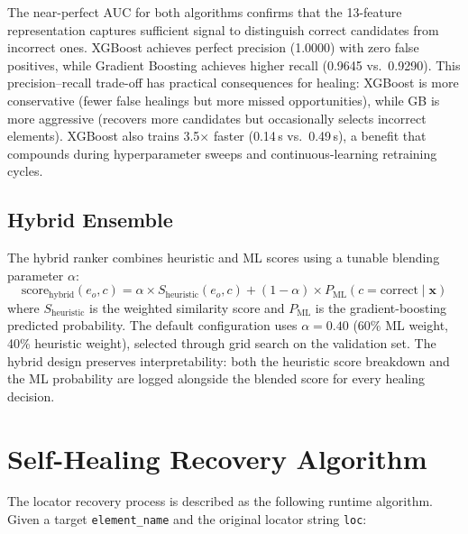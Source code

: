 \documentclass[12pt]{article}
\begin{document}
The near-perfect AUC for both algorithms confirms that the 13-feature representation captures sufficient signal to distinguish correct candidates from incorrect ones. XGBoost achieves perfect precision (1.0000) with zero false positives, while Gradient Boosting achieves higher recall (0.9645 vs.\ 0.9290). This precision--recall trade-off has practical consequences for healing: XGBoost is more conservative (fewer false healings but more missed opportunities), while GB is more aggressive (recovers more candidates but occasionally selects incorrect elements). XGBoost also trains 3.5$\times$ faster (0.14\,s vs.\ 0.49\,s), a benefit that compounds during hyperparameter sweeps and continuous-learning retraining cycles.

\subsection{Hybrid Ensemble}

The hybrid ranker combines heuristic and ML scores using a tunable blending parameter $\alpha$:
\begin{equation}
\text{score}_{\text{hybrid}}(e_o, c) = \alpha \times S_{\text{heuristic}}(e_o, c) + (1 - \alpha) \times P_{\text{ML}}(c = \text{correct} \mid \mathbf{x})
\label{eq:hybrid}
\end{equation}
where $S_{\text{heuristic}}$ is the weighted similarity score and $P_{\text{ML}}$ is the gradient-boosting predicted probability. The default configuration uses $\alpha = 0.40$ (60\% ML weight, 40\% heuristic weight), selected through grid search on the validation set. The hybrid design preserves interpretability: both the heuristic score breakdown and the ML probability are logged alongside the blended score for every healing decision.

\section{Self-Healing Recovery Algorithm}
\label{sec:algorithm}

The locator recovery process is described as the following runtime algorithm. Given a target \texttt{element\_name} and the original locator string \texttt{loc}:
\end{document}
